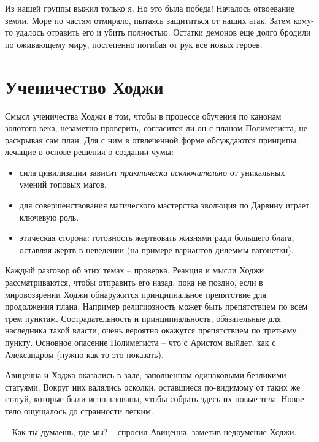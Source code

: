 \documentclass[12pt,a4paper]{article}
\newenvironment{meta}{
\begin{tcolorbox}[breakable, colback=lightgray, colframe=gray]
}{
\end{tcolorbox}
}
\begin{document}
Из нашей группы выжил только я. Но это была победа! Началось отвоевание земли. Море по частям отмирало, пытаясь защититься от наших атак. Затем кому-то удалось отравить его и убить полностью. Остатки демонов еще долго бродили по оживающему миру, постепенно погибая от рук все новых героев.

\section*{Ученичество Ходжи}

\begin{meta}
Смысл ученичества Ходжи в том, чтобы в процессе обучения по канонам золотого века, незаметно проверить, согласится ли он с планом Полимегиста, не раскрывая сам план. Для с ним в отвлеченной форме обсуждаются принципы, лечащие в основе решения о создании чумы:
\begin{itemize}
	\item сила цивилизации зависит \emph{практически исключительно} от уникальных умений топовых магов.
	\item для совершенствования магического мастерства эволюция по Дарвину играет ключевую роль.
	\item этическая сторона: готовность жертвовать жизнями ради большего блага, оставляя жертв в неведении (на примере вариантов дилеммы вагонетки).
\end{itemize}
Каждый разговор об этих темах -- проверка. Реакция и мысли Ходжи рассматриваются, чтобы отправить его назад, пока не поздно, если в мировоззрении Ходжи обнаружится принципиальное препятствие для продолжения плана. Например религиозность может быть препятствием по всем трем пунктам. Сострадательность и принципиальность, обязательные для наследника такой власти, очень вероятно окажутся препятствием по третьему пункту. Основное опасение Полимегиста -- что с Аристом выйдет, как с Александром (нужно как-то это показать).

\end{meta}

Авиценна и Ходжа оказались в зале, заполненном одинаковыми безликими статуями. Вокруг них валялись осколки, оставшиеся по-видимому от таких же статуй, которые были использованы, чтобы собрать здесь их новые тела. Новое тело ощущалось до странности легким.

-- Как ты думаешь, где мы? -- спросил Авиценна, заметив недоумение Ходжи.
\end{document}
